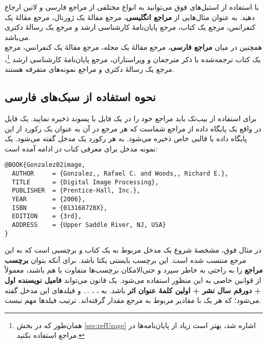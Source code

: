 با استفاده از استیل‌های فوق می‌توانید به انواع مختلفی از مراجع فارسی و لاتین ارجاع دهید.
به عنوان مثال‌هایی از
\textbf{مراجع انگلیسی}،
مرجع
\cite{Baker02limits}
مقالهٔ یک ژورنال، مرجع
\cite{Amintoosi09video}
مقالهٔ یک کنفرانس، مرجع
\cite{Gonzalez02book}
یک کتاب، مرجع
\cite{Khalighi07MscThesis}
پایان‌نامهٔ کارشناسی ارشد و مرجع
\cite{Borman04thesis}
یک رسالهٔ دکتری می‌باشد.\\
همچنین در میان
\textbf{مراجع فارسی}،
مرجع
\cite{Vahedi87}
مقالهٔ یک مجله، مرجع
\cite{Amintoosi87afzayesh}
مقالهٔ یک کنفرانس، مرجع
\cite{Pedram80osool}
یک کتاب ترجمه‌شده با ذکر مترجمان و ویراستاران، مرجع
\cite{Pourmousa88mscThesis}
پایان‌نامهٔ کارشناسی ارشد%
\footnote{همان‌طور که در بخش
\ref{sec:refUsage}
اشاره شد، بهتر است زیاد از پایان‌نامه‌ها در مراجع استفاده نکنید.}،
مرجع
\cite{Omidali82phdThesis}
یک رسالهٔ دکتری و مراجع
\cite{persianbib87userguide, Khalighi87xepersian}
نمونه‌های متفرقه هستند.

\subsection{ نحوه استفاده از سبک‌های فارسی}
برای استفاده از بیب‌تک باید مراجع خود را در یک فایل با پسوند  ذخیره نمایید. یک فایل  در واقع یک پایگاه داده از مراجع%
شماست که هر مرجع در آن به عنوان یک رکورد از این پایگاه داده
با قالبی خاص ذخیره می‌شود. به هر رکورد یک مدخل%
گفته می‌شود. یک نمونه مدخل برای معرفی کتاب  در ادامه آمده است:

\singlespacing
\begin{LTR}
\begin{verbatim}
@BOOK{Gonzalez02image,
  AUTHOR     = {Gonzalez,, Rafael C. and Woods,, Richard E.},
  TITLE      = {Digital Image Processing},
  PUBLISHER  = {Prentice-Hall, Inc.},
  YEAR       = {2006},
  ISBN       = {013168728X},
  EDITION    = {3rd},
  ADDRESS    = {Upper Saddle River, NJ, USA}
}
\end{verbatim}
\end{LTR}
\doublespacing

در مثال فوق،  مشخصهٔ شروع یک مدخل مربوط به یک کتاب و  برچسبی است که به این مرجع منتسب شده است.
 این برچسب بایستی یکتا باشد. برای آنکه بتوان
\textbf{برچسب مراجع}
 را به راحتی به خاطر سپرد و حتی‌الامکان برچسب‌ها متفاوت با هم باشند، معمولاً از قوانین خاصی به این منظور استفاده می‌شود. یک قانون می‌تواند
\textbf{فامیل نویسنده اول + دورقم سال نشر + اولین کلمهٔ عنوان اثر}
باشد. به
، ، $\dots$ و 
فیلدهای این مدخل گفته می‌شود؛ که هر یک با مقادیر مربوط به مرجع مقدار گرفته‌اند. ترتیب فیلدها مهم نیست. 

